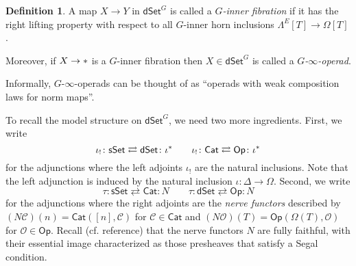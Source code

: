 \documentclass[a4paper,10pt
,draft
]{article}%
\numberwithin{equation}{section}
\numberwithin{figure}{section}
\theoremstyle{definition} %
\newtheorem{definition}[equation]{Definition}%
\newtheorem{example}[equation]{Example}%
\newcommand{\dSet}{\mathsf{dSet}}
\DeclareMathOperator{\Hom}{Hom}%
\newcommand{\1}{\ensuremath{\mathbbm 1}}%
\begin{document}
\begin{definition}
	A map $X \to Y$ in $\dSet^G$
	is called a \emph{$G$-inner fibration}
	if it has the right lifting property
	with respect to all $G$-inner horn inclusions
	$\Lambda^E[T] \to \Omega[T]$.
	
	Moreover, 
	if $X \to \**$
	is a $G$-inner fibration
	then 
	$X \in \dSet^G$ is called a \textit{$G$-$\infty$-operad}.
\end{definition}


Informally,
$G$-$\infty$-operads can be thought of as
``operads with weak composition laws for norm maps''.





To recall the model structure on $\mathsf{dSet}^G$,
we need two more ingredients.
First, we write
\begin{equation}\label{IOTASHADJ EQ}
	\iota_! \colon 
	\mathsf{sSet}
	\rightleftarrows
	\mathsf{dSet}
	\colon
	\iota^{\**}
\qquad
	\iota_! \colon 
	\mathsf{Cat}
	\rightleftarrows
	\mathsf{Op}
	\colon
	\iota^{\**}
\end{equation}
for the adjunctions
where the left adjoints $\iota_!$
are the natural inclusions.
Note that the left adjunction is induced by the natural inclusion
$\iota \colon \Delta \to \Omega$.
Second, we write
\begin{equation}\label{TAUADJ EQ}
	\tau \colon 
	\mathsf{sSet}
	\rightleftarrows
	\mathsf{Cat}
	\colon
	N
\qquad
	\tau \colon 
	\mathsf{dSet}
	\rightleftarrows
	\mathsf{Op}
	\colon
	N
\end{equation}
for the adjunctions where the right adjoints are the 
\emph{nerve functors}
described by
$(N \mathcal{C})(n) = 
\mathsf{Cat}\left([n],\mathcal{C}\right)$
for $\mathcal{C}\in \mathsf{Cat}$
and
$(N \mathcal{O})(T) = 
\mathsf{Op}\left(\Omega(T),\mathcal{O}\right)$
for $\mathcal{O}\in \mathsf{Op}$.
Recall (cf. {\color{red} reference})
that the nerve functors $N$ are fully faithful, 
with their essential image characterized
as those presheaves 
that satisfy a Segal condition.
\end{document}
